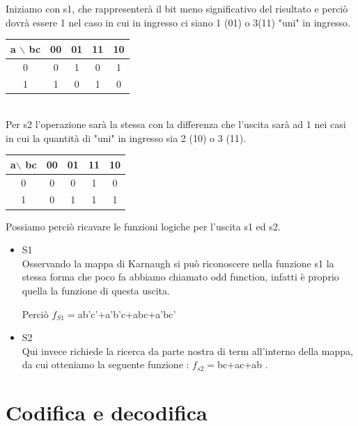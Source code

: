 \documentclass[a4paper]{book}
\begin{document}
Iniziamo con s1, che rappresenterà il bit meno significativo del risultato e perciò dovrà essere 1 nel caso in cui in ingresso ci siano 1 (01) o 3(11) "uni" in ingresso.

\vspace{\baselineskip}
\begin{tabular}{|c|c|c|c|c|}
\hline
a $\backslash$ bc & 00 & 01 & 11 & 10 \\
\hline
0              & 0  & {\cellcolor{yellow} 1 } &  0 & {\cellcolor{yellow}1}  \\
\hline
1             & {\cellcolor{yellow}1}  & 0  &  {\cellcolor{yellow}1} & 0  \\
\hline
\end{tabular}
\\ \vspace{\baselineskip}
Per s2 l'operazione sarà la stessa con la differenza che l'uscita sarà ad 1 nei casi in cui la quantità di "uni" in ingresso sia 2 (10) o 3 (11).
\\\vspace{\baselineskip}
\begin{tabular}{|c|c|c|c|c|}
\hline
a$\backslash$ bc & 00 & 01 & 11 & 10 \\
\hline
0              & 0  & 0  &  \cellcolor{yellow}1 & 0  \\
\hline
1              & 0  & \cellcolor{yellow}1  &  \cellcolor{yellow}1 & \cellcolor{yellow}1  \\
\hline
\end{tabular}




Possiamo perciò ricavare le funzioni logiche per l'uscita s1 ed s2.

\begin{itemize}
\item{S1} \\ Osservando la mappa di Karnaugh si può riconoscere nella funzione s1 la stessa forma che poco fa abbiamo chiamato odd function, infatti è proprio quella la funzione di questa uscita.

Perciò \(f_{S1}=\)ab'c'+a'b'c+abc+a'bc'

\item{S2} \\ Qui invece richiede la ricerca da parte nostra di term all'interno della mappa, da cui otteniamo la seguente funzione : \(f_{s2}=\)bc+ac+ab .
\end{itemize}
\section{Codifica e decodifica}
\end{document}
